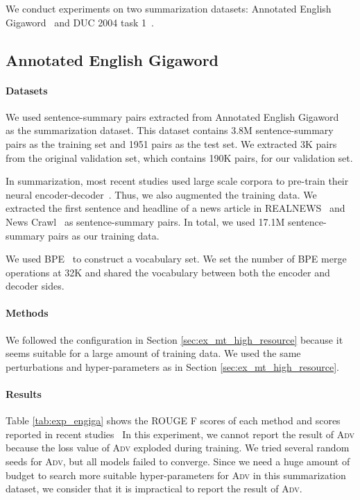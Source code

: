 \documentclass[11pt]{article}
\newcommand{\adv}{\textsc{Adv}}
\begin{document}
We conduct experiments on two summarization datasets: Annotated English Gigaword~\cite{napoles:2012:AG,rush-chopra-weston:2015:EMNLP} and DUC 2004 task 1~\cite{Over:2007:DC:1284916.1285157}.

\subsection{Annotated English Gigaword}
\label{sec:summarization_engiga}
\paragraph{Datasets}
We used sentence-summary pairs extracted from Annotated English Gigaword~\cite{napoles:2012:AG,rush-chopra-weston:2015:EMNLP} as the summarization dataset.
This dataset contains 3.8M sentence-summary pairs as the training set and 1951 pairs as the test set.
We extracted 3K pairs from the original validation set, which contains 190K pairs, for our validation set.

In summarization, most recent studies used large scale corpora to pre-train their neural encoder-decoder~\cite{NEURIPS2019_c20bb2d9,song2019mass,zhang2019pegasus,qi2020prophetnet}.
Thus, we also augmented the training data.
We extracted the first sentence and headline of a news article in REALNEWS~\cite{NEURIPS2019_3e9f0fc9} and News Crawl~\cite{barrault-etal-2019-findings} as sentence-summary pairs.
In total, we used 17.1M sentence-summary pairs as our training data.

We used BPE~\cite{sennrich-etal-2016-neural} to construct a vocabulary set.
We set the number of BPE merge operations at 32K and shared the vocabulary between both the encoder and decoder sides.

\paragraph{Methods}
We followed the configuration in Section \ref{sec:ex_mt_high_resource} because it seems suitable for a large amount of training data.
We used the same perturbations and hyper-parameters as in Section \ref{sec:ex_mt_high_resource}.

\paragraph{Results}
Table \ref{tab:exp_engiga} shows the ROUGE F scores of each method and scores reported in recent studies~\cite{NEURIPS2019_c20bb2d9,song2019mass,zhang2019pegasus,qi2020prophetnet}
In this experiment, we cannot report the result of \adv{} because the loss value of \adv{} exploded during training.
We tried several random seeds for \adv{}, but all models failed to converge.
Since we need a huge amount of budget to search more suitable hyper-parameters for \adv{} in this summarization dataset, we consider that it is impractical to report the result of \adv{}.
\end{document}
